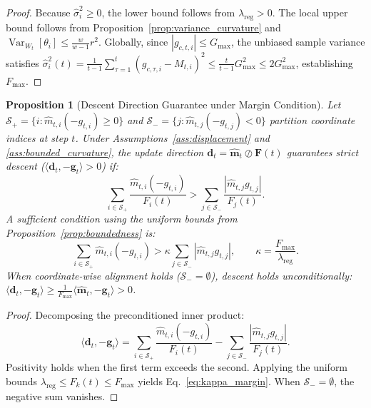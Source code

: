 \documentclass[11pt,a4paper]{article}
\newtheorem{proposition}{Proposition}
\begin{document}
\begin{proof}
Because $\hat{\sigma}_i^2 \ge 0$, the lower bound follows from $\lambda_{\text{reg}} > 0$. The local upper bound follows from Proposition~\ref{prop:variance_curvature} and $\operatorname{Var}_{W_t}[\theta_i] \le \frac{w}{w-1} r^2$. Globally, since $|g_{c,t,i}| \le G_{\max}$, the unbiased sample variance satisfies $\hat{\sigma}_i^2(t) = \frac{1}{t-1}\sum_{\tau=1}^t (g_{c,\tau,i} - M_{t,i})^2 \le \frac{t}{t-1} G_{\max}^2 \le 2 G_{\max}^2$, establishing $F_{\max}$.
\end{proof}

\begin{proposition}[Descent Direction Guarantee under Margin Condition]
\label{prop:descent}
Let $\mathcal{S}_+ = \{i : \hat{m}_{t,i}(-g_{t,i}) \ge 0\}$ and $\mathcal{S}_- = \{j : \hat{m}_{t,j}(-g_{t,j}) < 0\}$ partition coordinate indices at step $t$. Under Assumptions~\ref{ass:displacement} and \ref{ass:bounded_curvature}, the update direction $\mathbf{d}_t = \hat{\mathbf{m}}_t \oslash \mathbf{F}(t)$ guarantees strict descent ($\langle \mathbf{d}_t, -\mathbf{g}_t \rangle > 0$) if:
\begin{equation}
\sum_{i \in \mathcal{S}_+} \frac{\hat{m}_{t,i} (-g_{t,i})}{F_i(t)} > \sum_{j \in \mathcal{S}_-} \frac{|\hat{m}_{t,j} g_{t,j}|}{F_j(t)}.
\label{eq:margin_condition}
\end{equation}
A sufficient condition using the uniform bounds from Proposition~\ref{prop:boundedness} is:
\begin{equation}
\sum_{i \in \mathcal{S}_+} \hat{m}_{t,i} (-g_{t,i}) > \kappa \sum_{j \in \mathcal{S}_-} |\hat{m}_{t,j} g_{t,j}|, \qquad \kappa = \frac{F_{\max}}{\lambda_{\text{reg}}}.
\label{eq:kappa_margin}
\end{equation}
When coordinate-wise alignment holds ($\mathcal{S}_- = \emptyset$), descent holds unconditionally: $\langle \mathbf{d}_t, -\mathbf{g}_t \rangle \ge \frac{1}{F_{\max}} \langle \hat{\mathbf{m}}_t, -\mathbf{g}_t \rangle > 0$.
\end{proposition}

\begin{proof}
Decomposing the preconditioned inner product:
\begin{equation}
\langle \mathbf{d}_t, -\mathbf{g}_t \rangle = \sum_{i \in \mathcal{S}_+} \frac{\hat{m}_{t,i}(-g_{t,i})}{F_i(t)} - \sum_{j \in \mathcal{S}_-} \frac{|\hat{m}_{t,j} g_{t,j}|}{F_j(t)}.
\end{equation}
Positivity holds when the first term exceeds the second. Applying the uniform bounds $\lambda_{\text{reg}} \le F_k(t) \le F_{\max}$ yields Eq.~\eqref{eq:kappa_margin}. When $\mathcal{S}_- = \emptyset$, the negative sum vanishes.
\end{proof}
\end{document}
